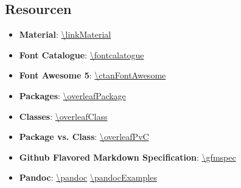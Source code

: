 \documentclass[14pt,aspectratio=169]{beamer}
\begin{document}
\subsection*{Resourcen}
\newcommand{\linkitem}[2]{\item \textbf{#1}: \scriptsize\url{#2}\normalsize}
\begin{frame}{\insertsubsection}
    \begin{itemize}
        \linkitem{Material}{\linkMaterial}
        \linkitem{Font Catalogue}{\fontcalatogue}
        \linkitem{Font Awesome 5}{\ctanFontAwesome}
        \linkitem{Packages}{\overleafPackage}
        \linkitem{Classes}{\overleafClass}
        \linkitem{Package vs. Class}{\overleafPvC}
        \linkitem{Github Flavored Markdown Specification}{\gfmspec}
        \linkitem{Pandoc}{\pandoc} \scriptsize\quad\url{\pandocExamples}\normalsize
    \end{itemize}
\end{frame}


\end{document}
